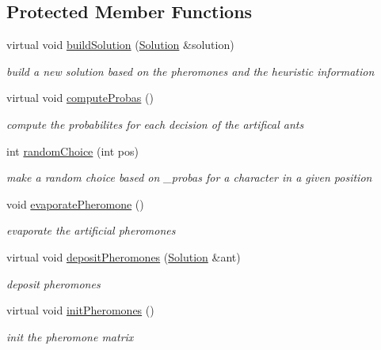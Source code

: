 \subsection*{Protected Member Functions}
\begin{DoxyCompactItemize}
\item 
virtual void \hyperlink{classAntColony_afdd84281a77faaaefcb452d2369926d4}{build\+Solution} (\hyperlink{classSolution}{Solution} \&solution)
\begin{DoxyCompactList}\small\item\em build a new solution based on the pheromones and the heuristic information \end{DoxyCompactList}\item 
virtual void \hyperlink{classAntColony_a88add29898beb8e99199700bd1af2e74}{compute\+Probas} ()\hypertarget{classAntColony_a88add29898beb8e99199700bd1af2e74}{}\label{classAntColony_a88add29898beb8e99199700bd1af2e74}

\begin{DoxyCompactList}\small\item\em compute the probabilites for each decision of the artifical ants \end{DoxyCompactList}\item 
int \hyperlink{classAntColony_a98842821d95984fcbe2606b74c827b47}{random\+Choice} (int pos)
\begin{DoxyCompactList}\small\item\em make a random choice based on \+\_\+probas for a character in a given position \end{DoxyCompactList}\item 
void \hyperlink{classAntColony_ab9d990e4de44baf962d959cac676f128}{evaporate\+Pheromone} ()\hypertarget{classAntColony_ab9d990e4de44baf962d959cac676f128}{}\label{classAntColony_ab9d990e4de44baf962d959cac676f128}

\begin{DoxyCompactList}\small\item\em evaporate the artificial pheromones \end{DoxyCompactList}\item 
virtual void \hyperlink{classAntColony_ae0a9eae45d8f8ef3cd0e29e4c70044e0}{deposit\+Pheromones} (\hyperlink{classSolution}{Solution} \&ant)
\begin{DoxyCompactList}\small\item\em deposit pheromones \end{DoxyCompactList}\item 
virtual void \hyperlink{classAntColony_a6b630369b5665552088ca28d11ef9c8d}{init\+Pheromones} ()\hypertarget{classAntColony_a6b630369b5665552088ca28d11ef9c8d}{}\label{classAntColony_a6b630369b5665552088ca28d11ef9c8d}

\begin{DoxyCompactList}\small\item\em init the pheromone matrix \end{DoxyCompactList}\end{DoxyCompactItemize}
